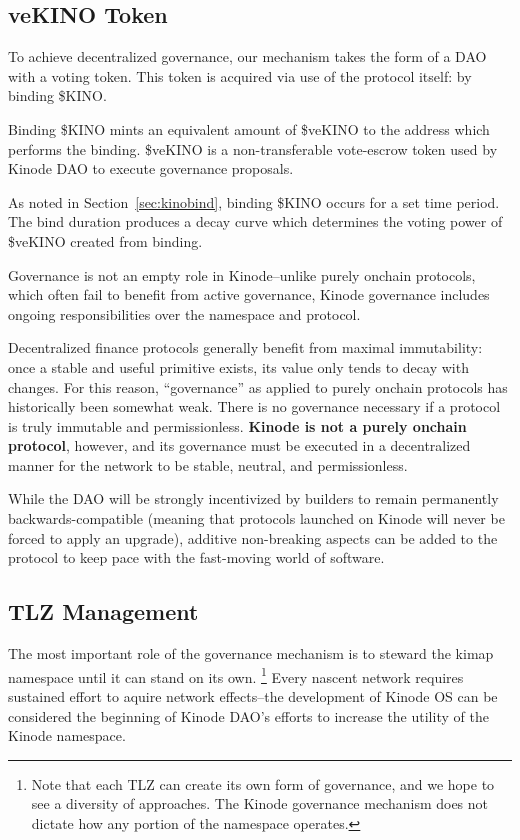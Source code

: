 \documentclass[runningheads]{llncs}
\begin{document}
\subsection{veKINO Token}
\label{sec:daovekino}

To achieve decentralized governance, our mechanism takes the form of a DAO with a voting token.
This token is acquired via use of the protocol itself: by binding \$KINO.

Binding \$KINO mints an equivalent amount of \$veKINO to the address which performs the binding.
\$veKINO is a non-transferable vote-escrow token used by Kinode DAO to execute governance proposals.

As noted in Section~\ref{sec:kinobind}, binding \$KINO occurs for a set time period.
The bind duration produces a decay curve which determines the voting power of \$veKINO created from binding.

Governance is not an empty role in Kinode–unlike purely onchain protocols, which often fail to benefit from active governance, Kinode governance includes ongoing responsibilities over the namespace and protocol.

Decentralized finance protocols generally benefit from maximal immutability: once a stable and useful primitive exists, its value only tends to decay with changes.
For this reason, ``governance'' as applied to purely onchain protocols has historically been somewhat weak.
There is no governance necessary if a protocol is truly immutable and permissionless. \textbf{Kinode is not a purely onchain protocol}, however, and its governance must be executed in a decentralized manner for the network to be stable, neutral, and permissionless.

While the DAO will be strongly incentivized by builders to remain permanently backwards-compatible (meaning that protocols launched on Kinode will never be forced to apply an upgrade), additive non-breaking aspects can be added to the protocol to keep pace with the fast-moving world of software.

\subsection{TLZ Management}
\label{sec:daotlzmanagement}

The most important role of the governance mechanism is to steward the kimap namespace until it can stand on its own.
\footnote{Note that each TLZ can create its own form of governance, and we hope to see a diversity of approaches. The Kinode governance mechanism does not dictate how any portion of the namespace operates.}
Every nascent network requires sustained effort to aquire network effects–the development of Kinode OS can be considered the beginning of Kinode DAO's efforts to increase the utility of the Kinode namespace.
\end{document}
